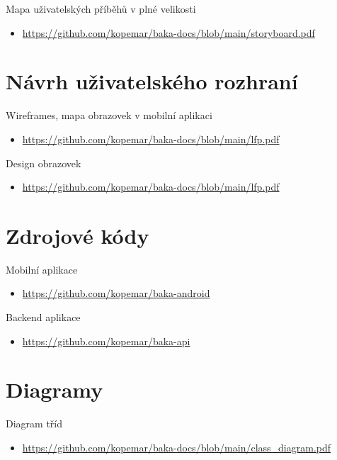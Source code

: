 \documentclass[twoside]{ctuthesis}
\begin{document}
Mapa uživatelských příběhů v plné velikosti
\begin{itemize}
	\item \url{https://github.com/kopemar/baka-docs/blob/main/storyboard.pdf}
\end{itemize}


\section{Návrh uživatelského rozhraní}\label{sec:ui}

Wireframes, mapa obrazovek v mobilní aplikaci
\begin{itemize}
	\item \url{https://github.com/kopemar/baka-docs/blob/main/lfp.pdf}
\end{itemize}


Design obrazovek 
\begin{itemize}
	\item \url{https://github.com/kopemar/baka-docs/blob/main/lfp.pdf}
\end{itemize}


\section{Zdrojové kódy}

Mobilní aplikace
\begin{itemize}
	\item \url{https://github.com/kopemar/baka-android}
\end{itemize}

Backend aplikace
\begin{itemize}
	\item \url{https://github.com/kopemar/baka-api}
\end{itemize}

\newpage

\section{Diagramy}\label{sec:diagram}

Diagram tříd
\begin{itemize}
	\item \url{https://github.com/kopemar/baka-docs/blob/main/class_diagram.pdf}
\end{itemize}
\end{document}
